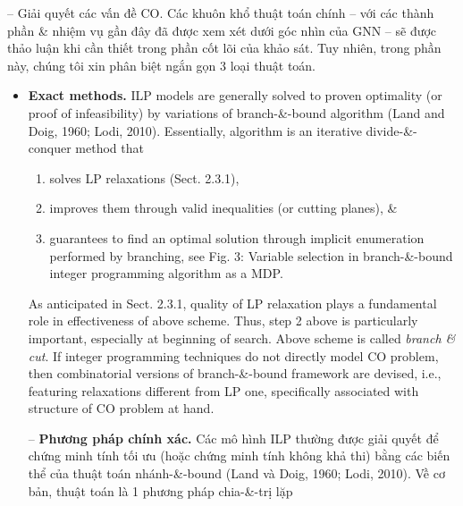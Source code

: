 \documentclass{article}
\begin{document}
\begin{itemize}
\begin{itemize}
\begin{itemize}
            -- {\sf Giải quyết các vấn đề CO.} Các khuôn khổ thuật toán chính -- với các thành phần \& nhiệm vụ gần đây đã được xem xét dưới góc nhìn của GNN -- sẽ được thảo luận khi cần thiết trong phần cốt lõi của khảo sát. Tuy nhiên, trong phần này, chúng tôi xin phân biệt ngắn gọn 3 loại thuật toán.
            \begin{itemize}
                \item {\bf Exact methods.} ILP models are generally solved to proven optimality (or proof of infeasibility) by variations of branch-\&-bound algorithm (Land and Doig, 1960; Lodi, 2010). Essentially, algorithm is an iterative divide-\&-conquer method that
                \begin{enumerate}
                    \item solves LP relaxations (Sect. 2.3.1),
                    \item improves them through valid inequalities (or cutting planes), \&
                    \item guarantees to find an optimal solution through implicit enumeration performed by branching, see {\sf Fig. 3: Variable selection in branch-\&-bound integer programming algorithm as a MDP.}
                \end{enumerate}
                As anticipated in Sect. 2.3.1, quality of LP relaxation plays a fundamental role in effectiveness of above scheme. Thus, step 2 above is particularly important, especially at beginning of search. Above scheme is called {\it branch \& cut}. If integer programming techniques do not directly model CO problem, then combinatorial versions of branch-\&-bound framework are devised, i.e., featuring relaxations different from LP one, specifically associated with structure of CO problem at hand.

                -- {\bf Phương pháp chính xác.} Các mô hình ILP thường được giải quyết để chứng minh tính tối ưu (hoặc chứng minh tính không khả thi) bằng các biến thể của thuật toán nhánh-\&-bound (Land và Doig, 1960; Lodi, 2010). Về cơ bản, thuật toán là 1 phương pháp chia-\&-trị lặp


\end{itemize}
\end{itemize}
\end{itemize}
\end{itemize}
\end{document}
